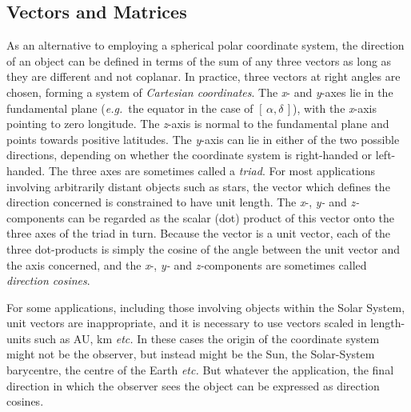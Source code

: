 \documentclass[11pt,fleqn,twoside]{article}
\renewcommand{\_}{{\tt\char'137}}     %
\newcommand{\radec}     {$[\,\alpha,\delta\,]$}
\begin{document}
\subsection {Vectors and Matrices}
As an alternative to employing a spherical polar coordinate system,
the direction of an object can be defined in terms of the sum of any
three vectors as long as they are different and
not coplanar.  In practice, three vectors at right angles are
chosen, forming a system
of {\it Cartesian coordinates}.  The {\it x}- and {\it y}-axes
lie in the fundamental plane ({\it e.g.}\ the equator in the
case of \radec), with the {\it x}-axis pointing to zero longitude.
The {\it z}-axis is normal to the fundamental plane and points
towards positive latitudes.  The {\it y}-axis can lie in either
of the two possible directions, depending on whether the
coordinate system is right-handed or left-handed.
The three axes are sometimes called
a {\it triad}.  For most applications involving arbitrarily
distant objects such as stars, the vector which defines
the direction concerned is constrained to have unit length.
The {\it x}-, {\it y-} and {\it z-}components
can be regarded as the scalar (dot) product of this vector
onto the three axes of the triad in turn.  Because the vector
is a unit vector,
each of the three dot-products is simply the cosine of the angle
between the unit vector and the axis concerned, and the
{\it x}-, {\it y-} and {\it z-}components are sometimes
called {\it direction cosines}.

For some applications, including those involving objects
within the Solar System, unit vectors are inappropriate, and
it is necessary to use vectors scaled in length-units such as
AU, km {\it etc.}
In these cases the origin of the coordinate system might not be
the observer, but instead might be the Sun, the Solar-System
barycentre, the centre of the Earth {\it etc.}  But whatever the application,
the final direction in which the observer sees the object can be
expressed as direction cosines.
\end{document}
